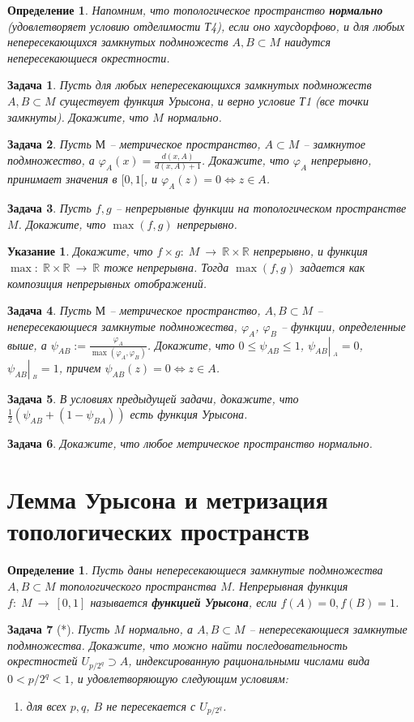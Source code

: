 \documentclass[12pt]{book}
\newcommand{\subs}{\section}
\newcommand{\arrow}{{\:\longrightarrow\:}}
\newcommand{\restrict}[1]{{\left|_{{\phantom{|}\!\!}_{#1}}\right.}}
\renewcommand{\phi}{\varphi}
\def\R{{\mathbb R}}
\theoremstyle{upshape}
\newtheorem{zadacha}{Задача}[chapter]
\theoremstyle{generic}
\newtheorem{opredelenie}[teorema]{Определение}
\newtheorem{remark}[teorema]{Замечание}
\def\замечание{\begin{remark}}
\def\еза{\end{remark}}
\theoremstyle{upshapenonumber}
\newtheorem{ukazanie}{Указание}[section]
\renewcommand{\labelenumi}{\ralph{enumi}.}
\newcommand{\следствие}{%
     \refstepcounter{teorema}
     {\noindent\bf Следствие \thechapter.\arabic{teorema}:\ }}
\newcommand{\пример}{%
     \refstepcounter{teorema}
     {\noindent\bf Пример \thechapter.\arabic{teorema}:\ }}
\newcommand{\лемма}{%
     \refstepcounter{teorema}
     {\noindent\bf Лемма \thechapter.\arabic{teorema}:\ }}
\newcommand{\теорема}{%
     \refstepcounter{teorema}
     {\noindent\bf Теорема \thechapter.\arabic{teorema}:\ }}
\newcommand{\утверждение}{%
     \refstepcounter{teorema}
     {\noindent\bf Утверждение \thechapter.\arabic{teorema}:\ }}
\def\бф{\bf}
\def\ем{\em}
\def\задача{\begin{zadacha}}
\def\ез{\end{zadacha}}
\def\указание{\begin{ukazanie}}
\def\еу{\end{ukazanie}}
\def\определение{\begin{opredelenie}}
\def\ео{\end{opredelenie}}
\def\енум{\begin{enumerate}}
\def\ее{\end{enumerate}}
\begin{document}
{ \определение
 Напомним, что топологическое пространство 
 {\бф нормально} (удовлетворяет условию отделимости Т4), если оно хаусдорфово, и
 для любых непересекающихся замкнутых подмножеств $A, B\subset
 M$ наидутся непересекающиеся окрестности.
 \ео  
 

\begin{zadacha}
Пусть для любых непересекающихся замкнутых подмножеств $A, B\subset
M$ существует функция Урысона, и верно условие Т1 (все точки замкнуты). 
Докажите, что $M$ нормально.
\end{zadacha}

\задача
Пусть $М$ -- метрическое пространство, $A\subset 
M$ -- замкнутое подмножество, а
$\phi_A(x)= \frac{d(x,A)}{d(x,A)+1}$.
Докажите, что $\phi_A$ непрерывно, принимает значения
в $[0,1[$, и  $\phi_A(z)=0\Leftrightarrow z\in A$.
\ез

\задача
Пусть $f, g$ -- непрерывные функции на топологическом
пространстве $M$. Докажите, что $\max(f,g)$ непрерывно.
\ез

\указание
Докажите, что $f\times g:\; M\arrow \R \times \R$
непрерывно, и функция $\max:\; \R\times \R \arrow \R$
тоже непрерывна. Тогда  $\max(f,g)$ задается
как композиция непрерывных отображений.
\еу

\задача
Пусть $М$ -- метрическое пространство, $A, B\subset
M$ -- непересекающиеся замкнутые подмножества, $\phi_A$,
$\phi_B$ -- функции, определенные выше, а 
$\psi_{AB}:=\frac{\phi_A}{\max(\phi_A,\phi_B)}$.
Докажите, что $0\leq \psi_{AB}\leq 1$, $\psi_{AB}\restrict A=0$,
$\psi_{AB}\restrict B=1$, причем $\psi_{AB}(z)=0\Leftrightarrow z\in A$.
\ез
\задача
В условиях предыдущей задачи, докажите, что 
$\frac 1 2 (\psi_{AB} + (1-\psi_{BA}))$ есть функция Урысона.
\ез


\задача
Докажите, что любое метрическое пространство нормально.
\ез



\subs{Лемма Урысона и метризация топологических пространств}

\begin{opredelenie}
Пусть даны непересекающиеся замкнутые подмножества $A, B\subset M$
топологического пространства $M$. Непрерывная функция $f:\; M \arrow
[0,1]$ называется {\bf функцией Урысона}, если $f(A)=0, f(B)=1$.
\end{opredelenie}


\begin{zadacha}[*]
Пусть $M$ нормально, а $A, B\subset M$ --
непересекающиеся замкнутые  подмножества. Докажите, что
можно найти последовательность окрестностей 
$U_{p/2^q}\supset A$, индексированную рациональными
числами вида $0<p/2^q<1$, и удовлетворяющую следующим
условиям:
\begin{enumerate}
\renewcommand{\labelenumi}{(\roman{enumi})}
\item для всех $p,q$, $B$ не пересекается с $U_{p/2^q}$.


\end{enumerate}
\end{zadacha}}
\end{document}
